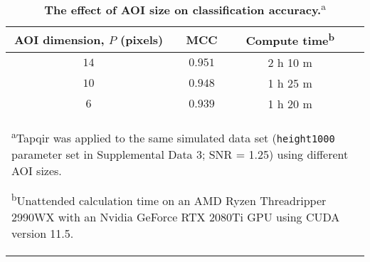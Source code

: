 \begin{table}[]
\caption{\label{tab:aoisize} \textbf{The effect of AOI size on classification accuracy.}\textsuperscript{a}}
\begin{tabular}{cccc}
    \toprule
    AOI dimension, $P$ (pixels) & MCC & Compute time\textsuperscript{b} \\
    \midrule
    $14$ & $0.951$ & 2 h 10 m \\
    $10$ & $0.948$ & 1 h 25 m \\
    $6$ & $0.939$ & 1 h 20 m \\
    \bottomrule
    \multicolumn{4}{l}{\footnotesize{\parbox{0.6\textwidth}{\rule{0pt}{3ex}\textsuperscript{a}Tapqir was applied to the same simulated data set (\texttt{height1000} parameter set in Supplemental Data 3; SNR = 1.25) using different AOI sizes.
    
    \textsuperscript{b}Unattended calculation time on an AMD Ryzen Threadripper 2990WX with an Nvidia GeForce RTX 2080Ti GPU using CUDA version 11.5.}}} \rule{0pt}{3ex} \\
    \bottomrule
\end{tabular}
\end{table}